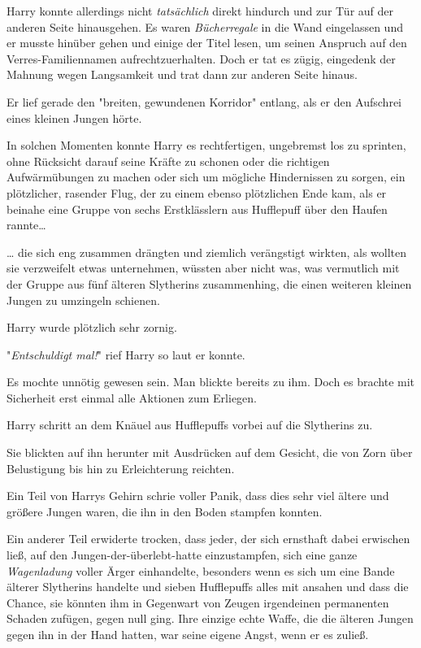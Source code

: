 {Harry konnte allerdings nicht \emph{tatsächlich} direkt hindurch und zur Tür auf der anderen Seite hinausgehen. Es waren \emph{Bücherregale} in die Wand eingelassen und er musste hinüber gehen und einige der Titel lesen, um seinen Anspruch auf den Verres-Familiennamen aufrechtzuerhalten. Doch er tat es zügig, eingedenk der Mahnung wegen Langsamkeit und trat dann zur anderen Seite hinaus.

Er lief gerade den "breiten, gewundenen Korridor" entlang, als er den Aufschrei eines kleinen Jungen hörte.

In solchen Momenten konnte Harry es rechtfertigen, ungebremst los zu sprinten, ohne Rücksicht darauf seine Kräfte zu schonen oder die richtigen Aufwärmübungen zu machen oder sich um mögliche Hindernissen zu sorgen, ein plötzlicher, rasender Flug, der zu einem ebenso plötzlichen Ende kam, als er beinahe eine Gruppe von sechs Erstklässlern aus Hufflepuff über den Haufen rannte…

… die sich eng zusammen drängten und ziemlich verängstigt wirkten, als wollten sie verzweifelt etwas unternehmen, wüssten aber nicht was, was vermutlich mit der Gruppe aus fünf älteren Slytherins zusammenhing, die einen weiteren kleinen Jungen zu umzingeln schienen.

Harry wurde plötzlich sehr zornig.

"\emph{Entschuldigt mal!}" rief Harry so laut er konnte.

Es mochte unnötig gewesen sein. Man blickte bereits zu ihm. Doch es brachte mit Sicherheit erst einmal alle Aktionen zum Erliegen.

Harry schritt an dem Knäuel aus Hufflepuffs vorbei auf die Slytherins zu.

Sie blickten auf ihn herunter mit Ausdrücken auf dem Gesicht, die von Zorn über Belustigung bis hin zu Erleichterung reichten.

Ein Teil von Harrys Gehirn schrie voller Panik, dass dies sehr viel ältere und größere Jungen waren, die ihn in den Boden stampfen konnten.

Ein anderer Teil erwiderte trocken, dass jeder, der sich ernsthaft dabei erwischen ließ, auf den Jungen-der-überlebt-hatte einzustampfen, sich eine ganze \emph{Wagenladung} voller Ärger einhandelte, besonders wenn es sich um eine Bande älterer Slytherins handelte und sieben Hufflepuffs alles mit ansahen und dass die Chance, sie könnten ihm in Gegenwart von Zeugen irgendeinen permanenten Schaden zufügen, gegen null ging. Ihre einzige echte Waffe, die die älteren Jungen gegen ihn in der Hand hatten, war seine eigene Angst, wenn er es zuließ.

}
